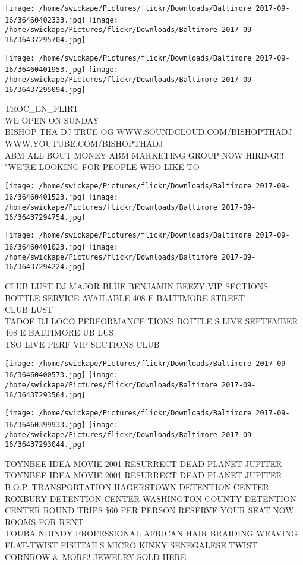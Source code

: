 \documentclass[10pt,letterpaper]{article}
\begin{document}
\texttt{[image: /home/swickape/Pictures/flickr/Downloads/Baltimore 2017-09-16/36460402333.jpg]}
\texttt{[image: /home/swickape/Pictures/flickr/Downloads/Baltimore 2017-09-16/36437295704.jpg]}

\texttt{[image: /home/swickape/Pictures/flickr/Downloads/Baltimore 2017-09-16/36460401953.jpg]}
\texttt{[image: /home/swickape/Pictures/flickr/Downloads/Baltimore 2017-09-16/36437295094.jpg]}

TROC\_EN\_FLIRT\\
WE OPEN ON SUNDAY\\
BISHOP THA DJ TRUE OG WWW.SOUNDCLOUD.COM/BISHOPTHADJ WWW.YOUTUBE.COM/BISHOPTHADJ\\
ABM ALL BOUT MONEY ABM MARKETING GROUP NOW HIRING!!! "WE'RE LOOKING FOR PEOPLE WHO LIKE TO
\pagebreak

\texttt{[image: /home/swickape/Pictures/flickr/Downloads/Baltimore 2017-09-16/36460401523.jpg]}
\texttt{[image: /home/swickape/Pictures/flickr/Downloads/Baltimore 2017-09-16/36437294754.jpg]}

\texttt{[image: /home/swickape/Pictures/flickr/Downloads/Baltimore 2017-09-16/36460401023.jpg]}
\texttt{[image: /home/swickape/Pictures/flickr/Downloads/Baltimore 2017-09-16/36437294224.jpg]}

CLUB LUST DJ MAJOR BLUE BENJAMIN BEEZY VIP SECTIONS BOTTLE SERVICE AVAILABLE 408 E BALTIMORE STREET\\
CLUB LUST\\
TADOE DJ LOCO PERFORMANCE TIONS BOTTLE S LIVE SEPTEMBER 408 E BALTIMORE UB LUS\\
TSO LIVE PERF VIP SECTIONS CLUB
\pagebreak

\texttt{[image: /home/swickape/Pictures/flickr/Downloads/Baltimore 2017-09-16/36460400573.jpg]}
\texttt{[image: /home/swickape/Pictures/flickr/Downloads/Baltimore 2017-09-16/36437293564.jpg]}

\texttt{[image: /home/swickape/Pictures/flickr/Downloads/Baltimore 2017-09-16/36460399933.jpg]}
\texttt{[image: /home/swickape/Pictures/flickr/Downloads/Baltimore 2017-09-16/36437293044.jpg]}

TOYNBEE IDEA MOVIE 2001 RESURRECT DEAD PLANET JUPITER TOYNBEE IDEA MOVIE 2001 RESURRECT DEAD PLANET JUPITER\\
B.O.P. TRANSPORTATION HAGERSTOWN DETENTION CENTER ROXBURY DETENTION CENTER WASHINGTON COUNTY DETENTION CENTER ROUND TRIPS \$60 PER PERSON RESERVE YOUR SEAT NOW\\
ROOMS FOR RENT\\
TOUBA NDINDY PROFESSIONAL AFRICAN HAIR BRAIDING WEAVING FLAT{-}TWIST FISHTAILS MICRO KINKY SENEGALESE TWIST CORNROW \& MORE!  JEWELRY SOLD HERE
\pagebreak
\end{document}
